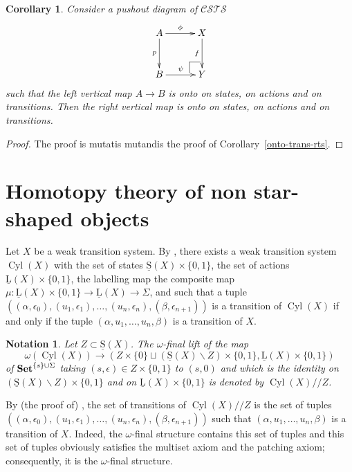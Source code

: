 \documentclass[a4paper,12pt]{amsart}
\newtheorem{cor}[thm]{Corollary}
\newtheorem{nota}[thm]{Notation}
\begin{document}
\begin{cor} \label{onto-trans-csts} Consider a pushout diagram of ${\mathcal{C\!S\!T\!S}}$
\[
\xymatrix@C=3em@R=3em
{
A {\ar@{->}[r]^-{{\phi}}} {\ar@{->}[d]_-{{p}}} & X {\ar@{->}[d]_-{{f}}} \\
B {\ar@{->}[r]^-{{\psi}}} & {  \ar@{-}[]+L+<-6pt,+2pt>;[]+LU+<-6pt,+6pt>  \ar@{-}[]+U+<-2pt,+6pt>;[]+LU+<-6pt,+6pt>} Y
}
\]
such that the left vertical map $A\to B$ is onto on states, on actions
and on transitions. Then the right vertical map is onto on states, on
actions and on transitions. 
\end{cor}

\begin{proof} The proof is mutatis mutandis the proof of
Corollary~\ref{onto-trans-rts}.  \end{proof}

\section{Homotopy theory of non star-shaped objects}
\label{modelcsts}

Let $X$ be a weak transition system. By
\cite[Proposition~2.10]{biscsts1}, there exists a weak transition
system $\operatorname{{Cyl}}(X)$ with the set of states $\operatorname{\underline{S}}(X)\times \{0,1\}$, the set of
actions $\operatorname{\underline{L}}(X)\times \{0,1\}$, the labelling map the composite map
$\mu:\operatorname{\underline{L}}(X)\times \{0,1\} \to \operatorname{\underline{L}}(X) \to \Sigma$, and such that a tuple
$((\alpha,\epsilon_0),(u_1,\epsilon_1),\dots,(u_n,\epsilon_n),(\beta,\epsilon_{n+1}))$
is a transition of $\operatorname{{Cyl}}(X)$ if and only if the tuple
$(\alpha,u_1,\dots,u_n,\beta)$ is a transition of $X$.

\begin{nota} Let $Z\subset \operatorname{\underline{S}}(X)$. The $\omega$-final lift of the map
\[\omega(\operatorname{{Cyl}}(X)) \longrightarrow (Z\times \{0\} \sqcup (\operatorname{\underline{S}}(X)\backslash
Z)\times \{0,1\},\operatorname{\underline{L}}(X) \times \{0,1\})\] of ${{{\rm{\mathbf{{Set}}}}}}^{\{s\}\cup \Sigma}$ taking
$(s,\epsilon)\in Z\times \{0,1\}$ to $(s,0)$ and which is the identity on
$(\operatorname{\underline{S}}(X)\backslash Z)\times \{0,1\}$ and on $\operatorname{\underline{L}}(X)\times \{0,1\}$ is denoted
by $\operatorname{{Cyl}}(X)//Z$. \end{nota}

By (the proof of) \cite[Lemma~3.12]{biscsts1}, the set of transitions
of $\operatorname{{Cyl}}(X)//Z$ is the set of tuples
$((\alpha,\epsilon_0),(u_1,\epsilon_1),\dots,(u_n,\epsilon_n),(\beta,\epsilon_{n+1}))$
such that $(\alpha,u_1,\dots,u_n,\beta)$ is a transition of
$X$. Indeed, the $\omega$-final structure contains this set of tuples
and this set of tuples obviously satisfies the multiset axiom and the
patching axiom; consequently, it is the $\omega$-final structure.
\end{document}

